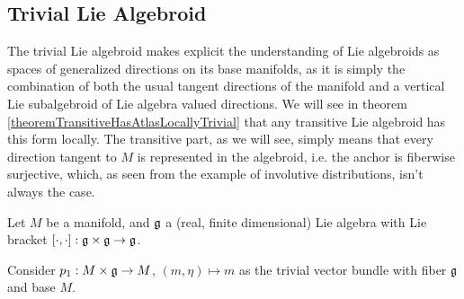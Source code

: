 \subsection{Trivial Lie Algebroid}\label{exampleSubSectionTLA}

The trivial Lie algebroid makes explicit the understanding of Lie algebroids as spaces of generalized directions on its base manifolds, as it is simply the combination of both the usual tangent directions of the manifold and a vertical Lie subalgebroid of Lie algebra valued directions. We will see in theorem \ref{theoremTransitiveHasAtlasLocallyTrivial} that any transitive Lie algebroid has this form locally. The transitive part, as we will see, simply means that every direction tangent to $M$ is represented in the algebroid, i.e. the anchor is fiberwise surjective, which, as seen from the example of involutive distributions, isn't always the case.

Let $M$ be a manifold, and $\mathfrak{g}$ a (real, finite dimensional) Lie algebra with Lie bracket $[\cdot , \cdot]: \mathfrak{g} \times \mathfrak{g} \to \mathfrak{g}$.

Consider $p_1: M \times \mathfrak{g} \to M$, $(m, \eta) \mapsto m$ as the trivial vector bundle with fiber $\mathfrak{g}$ and base $M$. %

